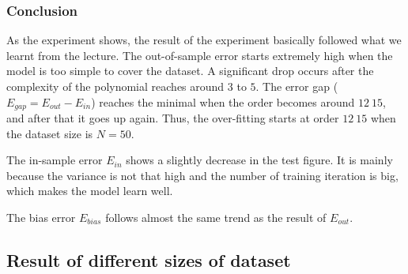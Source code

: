 \documentclass{article}
\begin{document}
\subsubsection{Conclusion}

As the experiment shows, the result of the experiment basically followed what we learnt from the lecture. The out-of-sample error starts extremely high when the model is too simple to cover the dataset. A significant drop occurs after the complexity of the polynomial reaches around $3$ to $5$. The error gap ($E_{gap} = E_{out} - E_{in}$) reaches the minimal when the order becomes around $12 ~ 15$, and after that it goes up again. Thus, the over-fitting starts at order $12 ~ 15$ when the dataset size is $N = 50$.

The in-sample error $E_{in}$ shows a slightly decrease in the test figure. It is mainly because the variance is not that high and the number of training iteration is big, which makes the model learn well.

The bias error $E_{bias}$ follows almost the same trend as the result of $E_{out}$.

\subsection{Result of different sizes of dataset}
\end{document}

